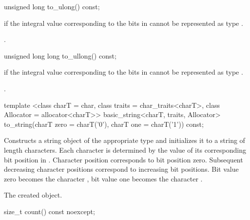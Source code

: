 %
\begin{itemdecl}
unsigned long to_ulong() const;
\end{itemdecl}

\begin{itemdescr}
\pnum
\throws
{}%
if the integral value  corresponding to the bits in
cannot be represented as type
.

\pnum
\returns
{}.
\end{itemdescr}

%
\begin{itemdecl}
unsigned long long to_ullong() const;
\end{itemdecl}

\begin{itemdescr}
\pnum
{}%
\throws
{}
if the integral value  corresponding to the bits in
cannot be represented as type
.

\pnum
\returns
{}.
\end{itemdescr}

%
\begin{itemdecl}
template <class charT = char,
    class traits = char_traits<charT>,
    class Allocator = allocator<charT>>
  basic_string<charT, traits, Allocator>
  to_string(charT zero = charT('0'), charT one = charT('1')) const;
\end{itemdecl}

\begin{itemdescr}
\pnum
\effects
Constructs a string object of the appropriate type
and initializes it to a string of length  characters.
Each character is determined by the value of its corresponding bit position in
.
Character position  corresponds to bit position zero.
Subsequent decreasing character positions correspond to increasing bit
positions.
Bit value zero becomes the character ,
bit value one becomes the character
.

\pnum
\returns
The created object.
\end{itemdescr}

%
\begin{itemdecl}
size_t count() const noexcept;
\end{itemdecl}

